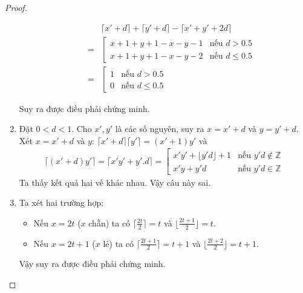 \begin{proof}
\begin{enumerate}[label=\alph*)]
\begin{itemize}
\begin{align*}
                &\lceil x'+d\rceil+\lceil y'+d\rceil-\lceil x'+y'+2d\rceil\\
                =&
                \left[
                \begin{array}{ll}
                    x+1+y+1-x-y-1 & \text{nếu $d>0.5$}\\
                    x+1+y+1-x-y-2 & \text{nếu $d\leq0.5$}
                \end{array}
                \right .\\
                =&
                \left[
                \begin{array}{ll}
                    1 & \text{nếu $d>0.5$}\\
                    0 & \text{nếu $d\leq0.5$}
                \end{array}
                \right .
            \end{align*}
        \end{itemize}
        Suy ra được điều phải chứng minh.
        \item Đặt $0<d<1$. Cho $x',y'$ là các số nguyên, suy ra $x=x'+d$ và $y=y'+d$. Xét $x=x'+d$ và $y$:
            $\lceil x'+d\rceil\lceil y'\rceil=(x'+1)y'$ và
            \begin{align*}
                \lceil(x'+d)y'\rceil=\lceil x'y'+y'.d\rceil=
                \left[
                \begin{array}{ll}
                    x'y'+\lfloor y'd\rfloor+1 & \text{nếu $y'd\notin\mathbb{Z}$}\\
                    x'y+y'd & \text{nếu $y'd\in\mathbb{Z}$}
                \end{array}
                \right .
            \end{align*}
            Ta thấy kết quả hai vế khác nhau. Vậy câu này sai.
        \item Ta xét hai trường hợp: \begin{itemize}
            \item Nếu $x=2t$ ($x$ chẵn) ta có $\lceil\frac{2t}{2}\rceil=t$ và $\lfloor\frac{2t+1}{2}\rfloor=t$.
            \item Nếu $x=2t+1$ ($x$ lẻ) ta có $\lceil\frac{2t+1}{2}\rceil=t+1$ và $\lfloor\frac{2t+2}{2}\rfloor=t+1$.
        \end{itemize}
        Vậy suy ra được điều phải chứng minh.
    \end{enumerate}
\end{proof}
